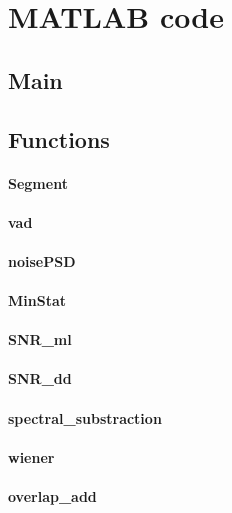 \onecolumn
\appendices \label{sec:appendix}

\section{MATLAB code}
\subsection{Main}

\clearpage
\subsection{Functions}
\paragraph{Segment}

\paragraph{vad}

\paragraph{noisePSD}

\paragraph{MinStat}

\paragraph{SNR\_ml}

\paragraph{SNR\_dd}

\paragraph{spectral\_substraction}

\paragraph{wiener}

\paragraph{overlap\_add}



